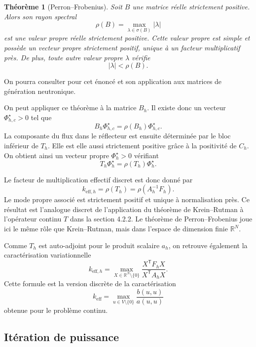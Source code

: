\documentclass{article}
\newtheorem{theorem}{Théorème}[section]
\newcommand{\keff}{k_{\mathrm{eff}}}
\begin{document}
\newpage
\begin{theorem}[Perron--Frobenius]
    Soit $B$ une matrice réelle strictement positive. Alors son rayon
    spectral
    \[
        \rho(B)=\max_{\lambda\in\sigma(B)}|\lambda|
    \]
    est une valeur propre réelle strictement positive. Cette valeur
    propre est simple et possède un vecteur propre strictement positif,
    unique à un facteur multiplicatif près. De plus, toute autre valeur
    propre $\lambda$ vérifie
    \[
        |\lambda|<\rho(B).
    \]
\end{theorem}
On pourra consulter \cite[chap.~6, section~6.2]{Allaire2018} pour cet énoncé et son application aux matrices de génération neutronique.

On peut appliquer ce théorème à la matrice $B_h$. Il existe donc un
vecteur $\Phi_{h,c}^\star>0$ tel que
\[
    B_h\Phi_{h,c}^\star
    =
    \rho(B_h)\Phi_{h,c}^\star.
\]
La composante du flux dans le réflecteur est ensuite déterminée par le
bloc inférieur de $T_h$. Elle est elle aussi strictement positive grâce
à la positivité de $C_h$. On obtient ainsi un vecteur propre
$\Phi_h^\star>0$ vérifiant
\[
    T_h\Phi_h^\star
    =
    \rho(T_h)\Phi_h^\star.
\]

Le facteur de multiplication effectif discret est donc donné par
\begin{equation}
    \boxed{
        k_{\mathrm{eff},h}
        =
        \rho(T_h)
        =
        \rho(A_h^{-1}F_h).
    }
    \label{eq:keff-rayon-spectral}
\end{equation}
Le mode propre associé est strictement positif et unique à normalisation près. Ce résultat est l'analogue discret de l'application du théorème de Krein--Rutman à l'opérateur continu $T$ dans la section 4.2.2. Le théorème de Perron--Frobenius joue ici le même rôle que Krein--Rutman, mais dans l'espace de dimension finie
$\mathbb{R}^N$.

Comme $T_h$ est auto-adjoint pour le produit scalaire $a_h$, on retrouve
également la caractérisation variationnelle
\begin{equation}
    \boxed{
        k_{\mathrm{eff},h}
        =
        \max_{X\in\mathbb{R}^N\setminus\{0\}}
        \frac{X^{\mathsf T}F_hX}
             {X^{\mathsf T}A_hX}.
    }
    \label{eq:rayleigh-discret}
\end{equation}
Cette formule est la version discrète de la caractérisation
\[
    \keff = \max_{u\in V\setminus\{0\}} \frac{b(u,u)}{a(u,u)}
\]
obtenue pour le problème continu.

\subsection {Itération de puissance}
\end{document}
